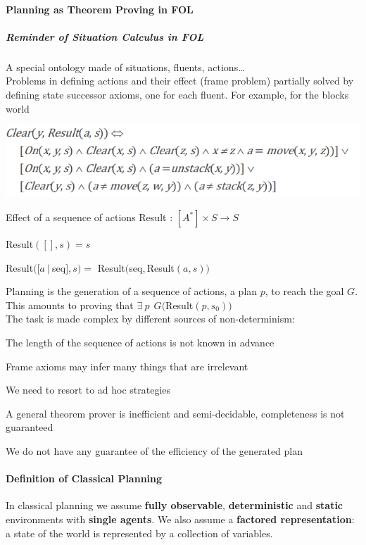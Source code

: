 \documentclass[10pt]{report}
\begin{document}
\paragraph{Planning as Theorem Proving in FOL}
\subparagraph{Reminder of Situation Calculus in FOL} A special ontology made of situations, fluents, actions\ldots\\
Problems in defining actions and their effect (frame problem) partially solved by defining state successor axioms, one for each fluent. For example, for the blocks world\begin{center}
	\includegraphics[scale=0.5]{23.png}
\end{center}
Effect of a sequence of actions Result : $[A^*]\times S \rightarrow S$
\begin{list}{}{}
	\item Result$([],s)=s$
	\item Result$([a\:|\:$seq$],s)=$ Result$($seq$,$Result$(a,s))$
\end{list}
Planning is the generation of a sequence of actions, a plan $p$, to reach the goal $G$. This amounts to proving that $\exists\:p\:\:G($Result$(p,s_0))$\\
The task is made complex by different sources of non-determinism:
\begin{list}{}{}
	\item The length of the sequence of actions is not known in advance
	\item Frame axioms may infer many things that are irrelevant
	\item We need to resort to ad hoc strategies
	\item A general theorem prover is inefficient and semi-decidable, completeness is not guaranteed
	\item We do not have any guarantee of the efficiency of the generated plan
\end{list}
\paragraph{Definition of Classical Planning}
In classical planning we assume \textbf{fully observable}, \textbf{deterministic} and \textbf{static} environments with \textbf{single agents}. We also assume a \textbf{factored representation}: a state of the world is represented by a collection of variables.
\end{document}
